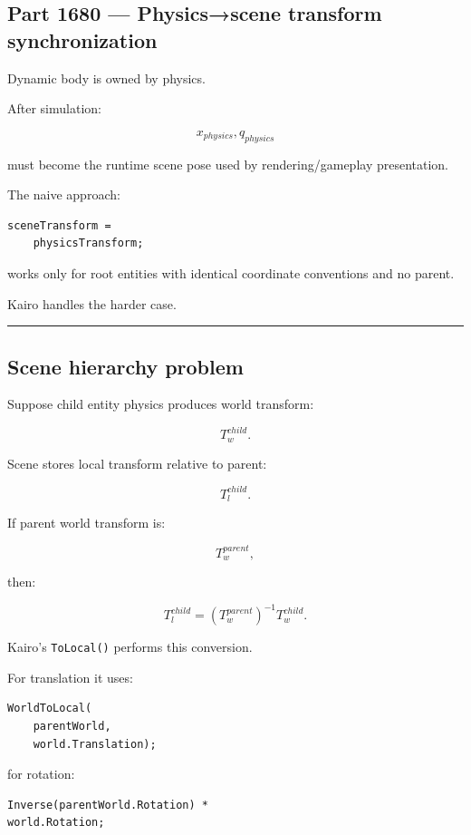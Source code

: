 \subsection{Part 1680 --- Physics→scene transform synchronization}\label{06-engine-ii-ch037-part-1680-physicsscene-transform-synchronization}

Dynamic body is owned by physics.

After simulation:

\[
x_{physics},q_{physics}
\]

must become the runtime scene pose used by rendering/gameplay presentation.

The naive approach:

\begin{verbatim}
sceneTransform =
    physicsTransform;
\end{verbatim}

works only for root entities with identical coordinate conventions and no parent.

Kairo handles the harder case.

\begin{center}\rule{0.5\linewidth}{0.5pt}\end{center}

\subsection{Scene hierarchy problem}\label{06-engine-ii-ch037-scene-hierarchy-problem}

Suppose child entity physics produces world transform:

\[
T_w^{child}.
\]

Scene stores local transform relative to parent:

\[
T_l^{child}.
\]

If parent world transform is:

\[
T_w^{parent},
\]

then:

\[
\boxed{
T_l^{child}
=
(T_w^{parent})^{-1}
T_w^{child}.
}
\]

Kairo's \texttt{ToLocal()} performs this conversion.

For translation it uses:

\begin{verbatim}
WorldToLocal(
    parentWorld,
    world.Translation);
\end{verbatim}

for rotation:

\begin{verbatim}
Inverse(parentWorld.Rotation) *
world.Rotation;
\end{verbatim}

